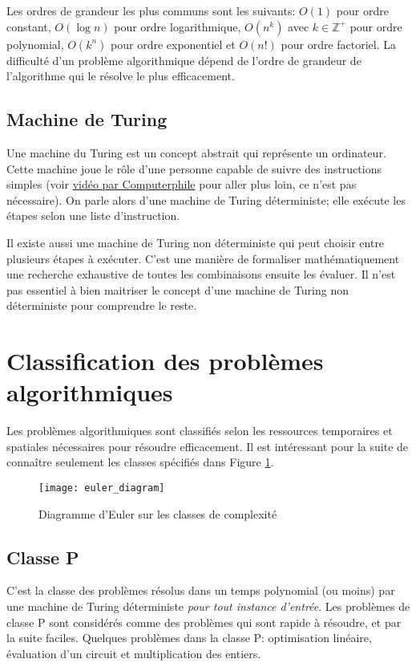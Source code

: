 \documentclass[../main.tex]{subfiles}
\begin{document}
Les ordres de grandeur les plus communs sont les suivants: $O(1)$ pour ordre constant, $O(\log n)$ pour ordre logarithmique, $O(n^k)$ avec $k \in \mathbb{Z}^+$ pour ordre polynomial, $O(k^n)$ pour ordre exponentiel et $O(n!)$ pour ordre factoriel. La difficulté d'un problème algorithmique dépend de l'ordre de grandeur de l'algorithme qui le résolve le plus efficacement.

\subsection{Machine de Turing}
Une machine du Turing est un concept abstrait qui représente un ordinateur. Cette machine joue le rôle d'une personne capable de suivre des instructions
simples (voir \href{https://www.youtube.com/watch?v=dNRDvLACg5Q}{vidéo par Computerphile} pour aller plus loin, ce n'est pas nécessaire). On parle alors
d'une machine de Turing déterministe; elle exécute les étapes selon une liste d'instruction.

Il existe aussi une machine de Turing non déterministe qui
peut choisir entre plusieurs étapes à exécuter. C'est une manière de formaliser mathématiquement une recherche exhaustive de toutes les combinaisons ensuite les évaluer. Il n'est pas essentiel à bien maitriser le concept d'une machine de Turing non déterministe pour
comprendre le reste.

\section{Classification des problèmes algorithmiques}
Les problèmes algorithmiques sont classifiés selon les ressources temporaires et spatiales nécessaires pour résoudre efficacement. Il est intéressant pour la suite de connaître seulement les classes spécifiés dans Figure \ref{fig:euler_diagram}.

\begin{figure}[!htb]
    \centering
    \texttt{[image: euler\_diagram]}
    \caption{Diagramme d'Euler sur les classes de complexité}
    \label{fig:euler_diagram}
\end{figure}

\subsection{Classe P}
C'est la classe des problèmes résolus dans un temps polynomial (ou moins) par une machine de Turing déterministe \emph{pour tout instance d'entrée}. Les problèmes de classe P sont considérés comme des problèmes qui sont rapide à résoudre, et par la suite faciles. Quelques problèmes dans la classe P: optimisation linéaire, évaluation d'un circuit et multiplication des entiers.
\end{document}
